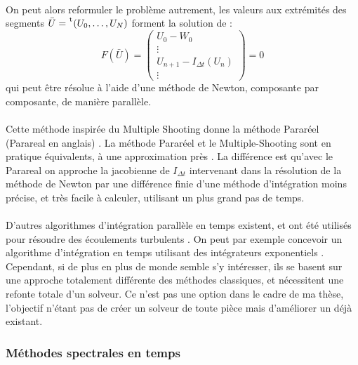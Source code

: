       \paragraph{}
      On peut alors reformuler le problème autrement, les valeurs aux extrémités des segments $\bar{U} = \mskip1mu\prescript{\smash{\mathrm t\mkern-3mu}}{}{\mathstrut\left(U_0, \dots, U_N\right)}$ forment la solution de :
      \[F\left(\bar{U}\right) = \begin{pmatrix}U_0 - W_0 \\ \vdots \\ U_{n+1} - I_{\Delta t}\left(U_n\right) \\ \vdots\end{pmatrix} = 0\]
      qui peut être résolue à l'aide d'une méthode de Newton, composante par composante, de manière parallèle.

      \paragraph{}
      Cette méthode inspirée du Multiple Shooting \cite{Nievergelt1964} donne la méthode Pararéel (Parareal en anglais) \cite{LionsMadayTurinici2001}.
      La méthode Pararéel et le Multiple-Shooting sont en pratique équivalents, à une approximation près \cite{GanderVandewalle2007}.
      La différence est qu'avec le Parareal on approche la jacobienne de $I_{\Delta t}$ intervenant dans la résolution de la méthode de Newton par une différence finie d'une méthode d'intégration moins précise, et très facile à calculer, utilisant un plus grand pas de temps.

      \paragraph{}
      D'autres algorithmes d'intégration parallèle en temps existent, et ont été utilisés pour résoudre des écoulements turbulents \cite{Lunet2018}.
      On peut par exemple concevoir un algorithme d'intégration en temps utilisant des intégrateurs exponentiels \cite{GanderGuettel2013}.
      Cependant, si de plus en plus de monde semble s'y intéresser, ils se basent sur une approche totalement différente des méthodes classiques, et nécessitent une refonte totale d'un solveur.
      Ce n'est pas une option dans le cadre de ma thèse, l'objectif n'étant pas de créer un solveur de toute pièce mais d'améliorer un déjà existant.


    \subsubsection{Méthodes spectrales en temps}


